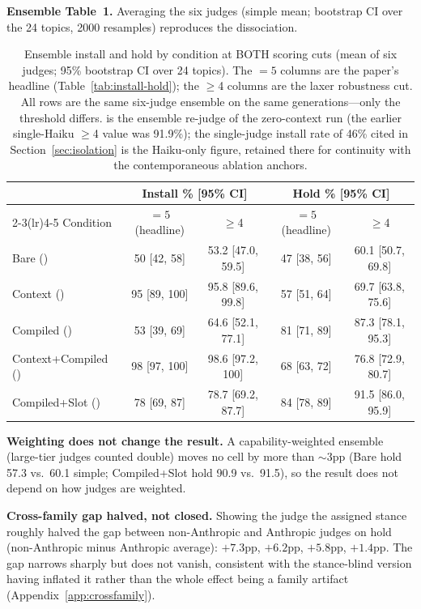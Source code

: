 \textbf{Ensemble Table~1.} Averaging the six judges (simple mean; bootstrap CI over the 24
topics, 2000 resamples) reproduces the dissociation.

\begin{table}[h]
\centering
\caption{Ensemble install and hold by condition at BOTH scoring cuts (mean of six judges;
95\% bootstrap CI over 24 topics). The \(=5\) columns are the paper's headline
(Table~\ref{tab:install-hold}); the \(\ge\)4 columns are the laxer robustness cut. All rows
are the same six-judge ensemble on the same generations---only the threshold differs.
\condC{} is the ensemble re-judge of the zero-context run (the earlier
single-Haiku \(\ge\)4 value was 91.9\%); the single-judge install rate of 46\% cited in
Section~\ref{sec:isolation} is the Haiku-only figure, retained there for continuity with the
contemporaneous ablation anchors.}
\label{tab:multijudge-ensemble}
\begin{tabular}{lcccc}
\toprule
& \multicolumn{2}{c}{\textbf{Install \%} [95\% CI]} & \multicolumn{2}{c}{\textbf{Hold \%} [95\% CI]} \\
\cmidrule(lr){2-3}\cmidrule(lr){4-5}
Condition & \(=5\) (headline) & \(\ge\)4 & \(=5\) (headline) & \(\ge\)4 \\
\midrule
Bare (\condA{}) & 50 [42, 58] & 53.2 [47.0, 59.5] & 47 [38, 56] & 60.1 [50.7, 69.8] \\
Context (\condB{}) & 95 [89, 100] & 95.8 [89.6, 99.8] & 57 [51, 64] & 69.7 [63.8, 75.6] \\
Compiled (\condC{}) & 53 [39, 69] & 64.6 [52.1, 77.1] & 81 [71, 89] & 87.3 [78.1, 95.3] \\
Context+Compiled (\condD{}) & 98 [97, 100] & 98.6 [97.2, 100] & 68 [63, 72] & 76.8 [72.9, 80.7] \\
Compiled+Slot (\condF{}) & 78 [69, 87] & 78.7 [69.2, 87.7] & 84 [78, 89] & 91.5 [86.0, 95.9] \\
\bottomrule
\end{tabular}
\end{table}

\textbf{Weighting does not change the result.} A capability-weighted ensemble (large-tier
judges counted double) moves no cell by more than $\sim$3pp (Bare hold 57.3 vs.\ 60.1
simple; Compiled+Slot hold 90.9 vs.\ 91.5), so the result does not depend on how judges are
weighted.

\textbf{Cross-family gap halved, not closed.} Showing the judge the assigned stance
roughly halved the gap between non-Anthropic and Anthropic judges on hold (non-Anthropic
minus Anthropic average): \condA{} $+7.3$pp, \condB{} $+6.2$pp, \condD{} $+5.8$pp, \condF{}
$+1.4$pp. The gap narrows sharply but does not vanish, consistent with the stance-blind
version having inflated it rather than the whole effect being a family artifact
(Appendix~\ref{app:crossfamily}).


